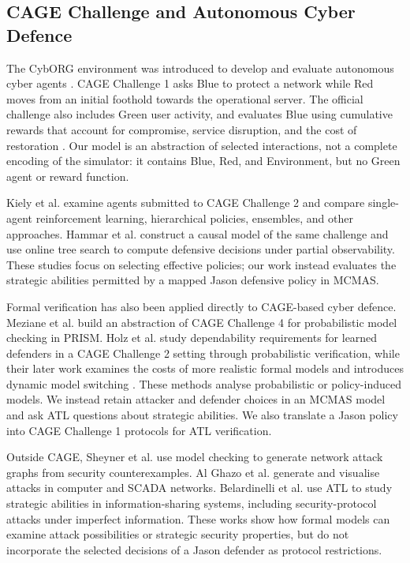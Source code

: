 \documentclass[runningheads]{llncs}
\begin{document}
\subsection{CAGE Challenge and Autonomous Cyber Defence}

The CybORG environment was introduced to develop and evaluate autonomous cyber agents \cite{standen2021cyborg}. CAGE Challenge 1 asks Blue to protect a network while Red moves from an initial foothold towards the operational server. The official challenge also includes Green user activity, and evaluates Blue using cumulative rewards that account for compromise, service disruption, and the cost of restoration \cite{cage2021challenge}. Our model is an abstraction of selected interactions, not a complete encoding of the simulator: it contains Blue, Red, and Environment, but no Green agent or reward function.

Kiely et al. \cite{kiely2023acd} examine agents submitted to CAGE Challenge 2 and compare single-agent reinforcement learning, hierarchical policies, ensembles, and other approaches. Hammar et al. \cite{hammar2024cage} construct a causal model of the same challenge and use online tree search to compute defensive decisions under partial observability. These studies focus on selecting effective policies; our work instead evaluates the strategic abilities permitted by a mapped Jason defensive policy in MCMAS.

Formal verification has also been applied directly to CAGE-based cyber defence. Meziane et al. \cite{meziane2025formal} build an abstraction of CAGE Challenge 4 for probabilistic model checking in PRISM. Holz et al. \cite{holz2026formal} study dependability requirements for learned defenders in a CAGE Challenge 2 setting through probabilistic verification, while their later work examines the costs of more realistic formal models and introduces dynamic model switching \cite{holz2026switch}. These methods analyse probabilistic or policy-induced models. We instead retain attacker and defender choices in an MCMAS model and ask ATL questions about strategic abilities. We also translate a Jason policy into CAGE Challenge 1 protocols for ATL verification.

Outside CAGE, Sheyner et al. \cite{sheyner2002attackgraphs} use model checking to generate network attack graphs from security counterexamples. Al Ghazo et al. \cite{alghazo2020a2g2v} generate and visualise attacks in computer and SCADA networks. Belardinelli et al. \cite{belardinelli2025strategic} use ATL to study strategic abilities in information-sharing systems, including security-protocol attacks under imperfect information. These works show how formal models can examine attack possibilities or strategic security properties, but do not incorporate the selected decisions of a Jason defender as protocol restrictions.
\end{document}
